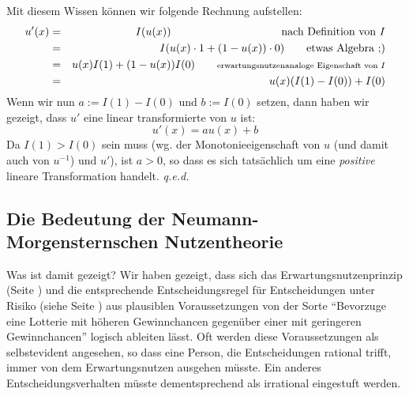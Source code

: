 Mit diesem Wissen können wir folgende Rechnung aufstellen:
\begin{eqnarray*}
u'(x) & = & I(u(x)) \qquad \qquad \qquad \qquad \qquad \mbox{nach Definition von
$I$} \\ { }   & = & I(u(x)\cdot 1 + (1-u(x)) \cdot 0) \qquad \mbox{etwas
Algebra ;)} \\ { }   & = & u(x)I(1) + (1-u(x))I(0) \qquad \mbox{{\scriptsize
                     erwartungsnutzenanaloge Eigenschaft von $I$}} \\
{ }   & = & u(x)(I(1)-I(0)) + I(0)
\end{eqnarray*}
Wenn wir nun $a := I(1)-I(0)$ und $b := I(0)$ setzen, dann haben wir gezeigt,
dass $u'$ eine linear transformierte von $u$ ist:
\[ u'(x) = au(x)+b \]
Da $I(1) > I(0)$ sein muss (wg. der Monotonieeigenschaft von $u$ (und
damit auch von $u^{-1}$) und $u'$), ist $a > 0$, so dass es sich tatsächlich um
eine {\em positive} lineare Transformation handelt. {\em q.e.d.}

\subsection{Die Bedeutung der Neumann-Morgensternschen Nutzentheorie}

Was ist damit gezeigt? Wir haben gezeigt, dass sich das Erwartungsnutzenprinzip
(Seite \pageref{Erwartungsnutzen}) und die entsprechende Entscheidungsregel für
Entscheidungen unter Risiko (siehe Seite \pageref{Erwartungsnutzenregel}) aus
plausiblen Voraussetzungen von der Sorte "`Bevorzuge eine Lotterie mit höheren
Gewinnchancen gegenüber einer mit geringeren Gewinnchancen"' logisch ableiten
lässt. Oft werden diese Voraussetzungen als selbstevident angesehen, so dass eine
Person, die Entscheidungen rational trifft, immer von dem
Erwartungsnutzen ausgehen müsste. Ein anderes Entscheidungsverhalten müsste
dementsprechend als irrational eingestuft werden.

